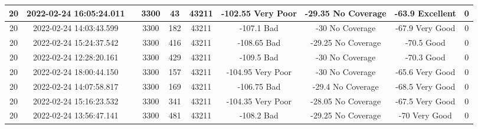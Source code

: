 \begin{longtable*}{|c|c|c|c|c|c|c|c|c|c|}
20&2022-02-24 16:05:24.011&&3300&43&43211& -102.55   Very Poor   & -29.35    No Coverage & -63.9     Excellent   & 0\\\hline
{}20&2022-02-24 14:03:43.599&&3300&182&43211& -107.1    Bad         & -30       No Coverage & -67.9     Very Good   & 0\\\hline
{}20&2022-02-24 15:24:37.542&&3300&416&43211& -108.65   Bad         & -29.25    No Coverage & -70.5     Good        & 0\\\hline
{}20&2022-02-24 12:28:20.161&&3300&429&43211& -109.5    Bad         & -30       No Coverage & -70.3     Good        & 0\\\hline
{}20&2022-02-24 18:00:44.150&&3300&157&43211& -104.95   Very Poor   & -30       No Coverage & -65.6     Very Good   & 0\\\hline
{}20&2022-02-24 14:07:58.817&&3300&169&43211& -106.75   Bad         & -29.4     No Coverage & -68.5     Very Good   & 0\\\hline
{}20&2022-02-24 15:16:23.532&&3300&341&43211& -104.35   Very Poor   & -28.05    No Coverage & -67.5     Very Good   & 0\\\hline
{}20&2022-02-24 13:56:47.141&&3300&481&43211& -108.2    Bad         & -29.25    No Coverage & -70       Very Good   & 0\\\hline

\end{longtable*}
